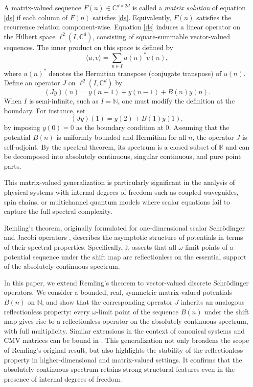 \documentclass[reqno]{amsart}
\numberwithin{equation}{section}
\begin{document}
A matrix-valued sequence \( F(n) \in \mathbb{C}^{d \times 2d} \) is called a \emph{matrix solution} of equation \eqref{ds} if each column of \( F(n) \) satisfies \eqref{ds}. Equivalently, \( F(n) \) satisfies the recurrence relation component-wise. Equation \eqref{ds} induces a linear operator on the Hilbert space \( \ell^2(I, \mathbb{C}^d) \), consisting of square-summable vector-valued sequences. The inner product on this space is defined by
\[
\langle u, v \rangle = \sum_{n \in I} u(n)^* v(n),
\]
where \( u(n)^* \) denotes the Hermitian transpose (conjugate transpose) of \( u(n) \). Define an operator \( J \) on \( \ell^2(I, \mathbb{C}^d) \) by
\begin{equation}\label{jo}
	(Jy)(n)= y(n+1)+y(n-1)+B(n)y(n) 
	. \end{equation}	 
When \( I \) is semi-infinite, such as \( I = \mathbb{N} \), one must modify the definition at the boundary. For instance, set
\[
(Jy)(1) = y(2) + B(1) y(1), \]
by imposing \( y(0) = 0 \) as the boundary condition at 0. Assuming that the potential \( B(n) \) is uniformly bounded and Hermitian for all \( n \), the operator \( J \) is self-adjoint. By the spectral theorem, its spectrum is a closed subset of \( \mathbb{R} \) and can be decomposed into absolutely continuous, singular continuous, and pure point parts.
 

This matrix-valued generalization is particularly significant in the analysis of physical systems with internal degrees of freedom such as coupled waveguides, spin chains, or multichannel quantum models where scalar equations fail to capture the full spectral complexity.
 
Remling's theorem, originally formulated for one-dimensional scalar Schr\"odinger and Jacobi operators \cite{CR1, CR2}, describes the asymptotic structure of potentials in terms of their spectral properties. Specifically, it asserts that all \(\omega\)-limit points of a potential sequence under the shift map are reflectionless on the essential support of the absolutely continuous spectrum.

In this paper, we extend Remling's theorem to vector-valued discrete Schr\"odinger operators. We consider a bounded, real, symmetric  matrix-valued potentials \( B(n) \) on \( \mathbb{N} \), and show that the corresponding operator \( J \) inherits an analogous reflectionless property: every \(\omega\)-limit point of the sequence \( B(n) \) under the shift map gives rise to a reflectionless operator on the absolutely continuous spectrum, with full multiplicity. Similar extensions in the context of canonical systems and CMV matrices can be bound in \cite{KA1,db}.   
This generalization not only broadens the scope of Remling's original result, but also highlights the stability of the reflectionless property in higher-dimensional and matrix-valued settings. It confirms that the absolutely continuous spectrum retains strong structural features even in the presence of internal degrees of freedom.
\end{document}

